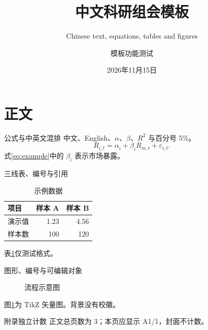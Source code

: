 \documentclass[11pt,compress]{beamer}
\title[无水印模板测试]{中文科研组会模板}
\subtitle{Chinese text, equations, tables and figures}
\author[模板测试]{模板功能测试}
\institute[科研组会]{可复用的 RUC Beamer 工程}
\date{2026年11月15日}
\begin{document}
\begin{frame}\titlepage\end{frame}
\section{正文}
\begin{frame}{公式与中英文混排}
中文、English、$\alpha$、$\beta$、$R^2$ 与百分号 5\%。
\begin{equation}\label{eq:example}
 R_{i,t}=\alpha_i+\beta_i R_{m,t}+\varepsilon_{i,t}.
\end{equation}
式\eqref{eq:example}中的 $\beta_i$ 表示市场暴露。
\end{frame}
\begin{frame}{三线表、编号与引用}
\begin{table}\centering
\caption{示例数据}\label{tab:test}
\begin{tabular}{lrr}\toprule
项目 & 样本 A & 样本 B\\\midrule
演示值 & 1.23 & 4.56\\
样本数 & 100 & 120\\\bottomrule
\end{tabular}
\end{table}
表\ref{tab:test}仅测试格式。
\end{frame}
\begin{frame}{图形、编号与可编辑对象}
\begin{figure}\centering
{}
\caption{流程示意图}\label{fig:test}
\end{figure}
图\ref{fig:test}为 TikZ 矢量图。背景没有校徽。
\end{frame}
\appendix
\begin{frame}{附录独立计数}
正文总页数为 3；本页应显示 A1/1，封面不计数。
\end{frame}
\end{document}
